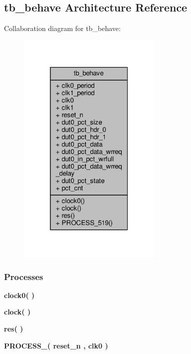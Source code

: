 \subsection{tb\+\_\+behave Architecture Reference}
\label{classp2d__wr__fsm__tb_1_1tb__behave}


Collaboration diagram for tb\+\_\+behave\+:\nopagebreak
\begin{figure}[H]
\begin{center}
\leavevmode
\includegraphics[width=196pt]{df/da4/classp2d__wr__fsm__tb_1_1tb__behave__coll__graph}
\end{center}
\end{figure}
\subsubsection*{Processes}
 \begin{DoxyCompactItemize}
\item 
{\bf clock0}{\bfseries  (  )}
\item 
{\bf clock}{\bfseries  (  )}
\item 
{\bf res}{\bfseries  (  )}
\item 
{\bf P\+R\+O\+C\+E\+S\+S\+\_}{\bfseries  ( {\bfseries {\bfseries {\bf reset\+\_\+n}} \textcolor{vhdlchar}{ }} , {\bfseries {\bfseries {\bf clk0}} \textcolor{vhdlchar}{ }} )}
\end{DoxyCompactItemize}
